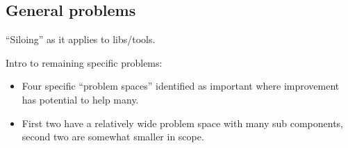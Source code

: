 \subsection{General problems}

``Siloing'' as it applies to libs/tools.

Intro to remaining specific problems:

\begin{itemize}
\item Four specific ``problem spaces'' identified as important where improvement has potential to help many.
\item First two have a relatively wide problem space with many sub components, second two are somewhat smaller in scope.
\end{itemize}
